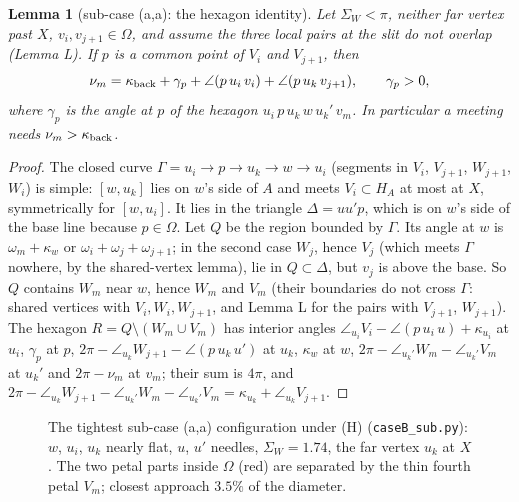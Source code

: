 \documentclass[11pt]{article}
\newtheorem{lemma}{Lemma}
\theoremstyle{definition}
\theoremstyle{remark}
\begin{document}
\begin{lemma}[sub-case (a,a): the hexagon identity]\label{hexagon}
Let $\Sigma_W<\pi$, neither far vertex past $X$, $v_i,v_{j+1}\in\Omega$, and assume the three local pairs at the
slit do not overlap (Lemma L). If $p$ is a common point of $V_i$ and $V_{j+1}$, then
\[
 \nu_m=\kappa_{\rm back}+\gamma_p+\angle(p\,u_i\,v_i)+\angle(p\,u_k\,v_{j+1}),\qquad \gamma_p>0,
\]
where $\gamma_p$ is the angle at $p$ of the hexagon $u_i\,p\,u_k\,w\,u_k'\,v_m$. In particular a meeting needs
$\nu_m>\kappa_{\rm back}$.
\end{lemma}
\begin{proof}
The closed curve $\Gamma=u_i\to p\to u_k\to w\to u_i$ (segments in $V_i$, $V_{j+1}$, $W_{j+1}$, $W_i$) is simple:
$[w,u_k]$ lies on $w$'s side of $A$ and meets $V_i\subset H_A$ at most at $X$, symmetrically for $[w,u_i]$. It lies
in the triangle $\Delta=uu'p$, which is on $w$'s side of the base line because $p\in\Omega$. Let $Q$ be the region
bounded by $\Gamma$. Its angle at $w$ is $\omega_m+\kappa_w$ or $\omega_i+\omega_j+\omega_{j+1}$; in the second
case $W_j$, hence $V_j$ (which meets $\Gamma$ nowhere, by the shared-vertex lemma), lie in $Q\subset\Delta$, but
$v_j$ is above the base. So $Q$ contains $W_m$ near $w$, hence $W_m$ and $V_m$ (their boundaries do not cross
$\Gamma$: shared vertices with $V_i,W_i,W_{j+1}$, and Lemma L for the pairs with $V_{j+1}$, $W_{j+1}$). The hexagon
$R=Q\setminus(W_m\cup V_m)$ has interior angles $\angle_{u_i}V_i-\angle(p\,u_i\,u)+\kappa_{u_i}$ at $u_i$, $\gamma_p$
at $p$, $2\pi-\angle_{u_k}W_{j+1}-\angle(p\,u_k\,u')$ at $u_k$, $\kappa_w$ at $w$, $2\pi-\angle_{u_k'}W_m-\angle_{u_k'}V_m$
at $u_k'$ and $2\pi-\nu_m$ at $v_m$; their sum is $4\pi$, and $2\pi-\angle_{u_k}W_{j+1}-\angle_{u_k'}W_m-\angle_{u_k'}V_m
=\kappa_{u_k}+\angle_{u_k}V_{j+1}$.
\end{proof}

\begin{figure}[h]\centering
\resizebox{0.9\linewidth}{!}{}
\caption{The tightest sub-case (a,a) configuration under (H) (\texttt{caseB\_sub.py}): $w$, $u_i$, $u_k$ nearly flat,
$u$, $u'$ needles, $\Sigma_W=1.74$, the far vertex $u_k$ at $X$. The two petal parts inside $\Omega$ (red) are
separated by the thin fourth petal $V_m$; closest approach $3.5\%$ of the diameter.}
\end{figure}
\end{document}
